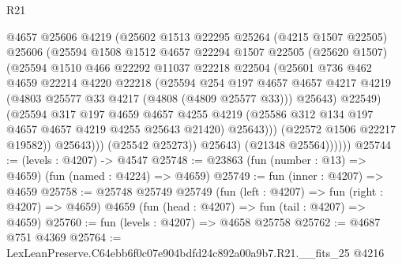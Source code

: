 \begin{lexlean}{R21}
\begin{coremodule}
                        @4657
                        @25606
                        @4219
                        (@25602
                          @1513
                          @22295
                          @25264
                          (@4215 @1507 @22505)
                          @25606
                          (@25594
                            @1508
                            @1512
                            @4657
                            @22294
                            @1507
                            @22505
                            (@25620 @1507)
                            (@25594
                              @1510
                              @466
                              @22292
                              @11037
                              @22218
                              @22504
                              (@25601
                                @736
                                @462
                                @4659
                                @22214
                                @4220
                                @22218
                                (@25594
                                  @254
                                  @197
                                  @4657
                                  @4657
                                  @4217
                                  @4219
                                  (@4803 @25577 @33 @4217 (@4808 (@4809 @25577 @33)))
                                  @25643)
                                @22549)
                              (@25594
                                @317
                                @197
                                @4659
                                @4657
                                @4255
                                @4219
                                (@25586 @312 @134 @197 @4657 @4657 @4219 @4255 @25643 @21420)
                                @25643)))
                          (@22572 @1506 @22217 @19582))
                        @25643)))
                  (@25542 @25273))
                @25643)
              (@21348 @25564))))))
@25744 := (levels : @4207) -> @4547
@25748 := @23863 (fun (number : @13) => @4659) (fun (named : @4224) => @4659)
@25749 := fun (inner : @4207) => @4659
@25758 := @25748
    @25749
    @25749
    (fun (left : @4207) => fun (right : @4207) => @4659)
    @4659
    (fun (head : @4207) => fun (tail : @4207) => @4659)
@25760 := fun (levels : @4207) => @4658 @25758
@25762 := @4687 @751 @4369
@25764 := LexLeanPreserve.C64ebb6f0c07e904bdfd24c892a00a9b7.R21.__fits_25 @4216

\end{coremodule}
\end{lexlean}
